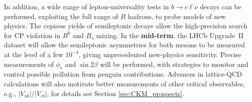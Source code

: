 In addition, a wide range of lepton-universality tests in $b \to c \ell \nu$ decays can be performed, exploiting the full range of
$B$ hadrons, to probe  models of new physics.
The copious yields of semileptonic decays allow the high-precision search for CP violation in $B^0$ and $B_s$ mixing. 
In the {\bf mid-term}, the LHCb Upgrade~II dataset will allow the semileptonic asymmetries for both mesons to be measured at the level of a few $10^{-4}$, giving unprecedented new-physics sensitivity.
Precise measurements of \textbf{${\phi_s}$} and 
\textbf{${\sin 2 \beta}$} will be performed, with strategies to monitor and control possible  pollution from penguin contributions.
Advances in lattice-QCD calculations will also motivate better measurements of other critical observables, e.g., $|V_{ub}|/|V_{cb}|$, for details see Section  \ref{sec:CKM_prospects}. 

